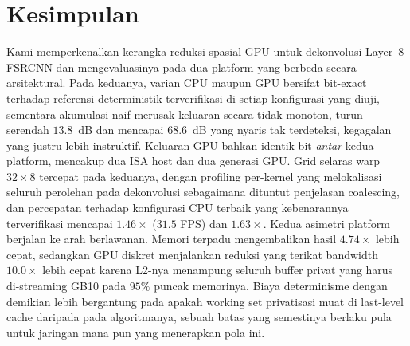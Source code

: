\documentclass[conference]{IEEEtran}
\begin{document}
\section{Kesimpulan}
Kami memperkenalkan kerangka reduksi spasial GPU untuk dekonvolusi Layer~8 FSRCNN dan mengevaluasinya pada dua platform yang berbeda secara arsitektural. Pada keduanya, varian CPU maupun GPU bersifat bit-exact terhadap referensi deterministik terverifikasi di setiap konfigurasi yang diuji, sementara akumulasi naif merusak keluaran secara tidak monoton, turun serendah $13.8$~dB dan mencapai $68.6$~dB yang nyaris tak terdeteksi, kegagalan yang justru lebih instruktif. Keluaran GPU bahkan identik-bit \emph{antar} kedua platform, mencakup dua ISA host dan dua generasi GPU. Grid selaras warp $32{\times}8$ tercepat pada keduanya, dengan profiling per-kernel yang melokalisasi seluruh perolehan pada dekonvolusi sebagaimana dituntut penjelasan coalescing, dan percepatan terhadap konfigurasi CPU terbaik yang kebenarannya terverifikasi mencapai $1.46\times$ ($31.5$ FPS) dan $1.63\times$. Kedua asimetri platform berjalan ke arah berlawanan. Memori terpadu mengembalikan hasil $4.74\times$ lebih cepat, sedangkan GPU diskret menjalankan reduksi yang terikat bandwidth $10.0\times$ lebih cepat karena L2-nya menampung seluruh buffer privat yang harus di-streaming GB10 pada $95\%$ puncak memorinya. Biaya determinisme dengan demikian lebih bergantung pada apakah working set privatisasi muat di last-level cache daripada pada algoritmanya, sebuah batas yang semestinya berlaku pula untuk jaringan mana pun yang menerapkan pola ini.
\end{document}
